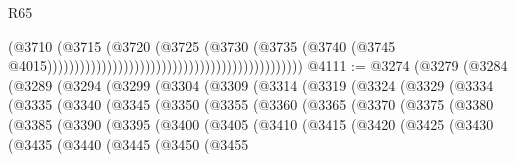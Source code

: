 \begin{lexlean}{R65}
\begin{coremodule}
{                                                                                  (@3710
                                                                                    (@3715
                                                                                      (@3720
                                                                                        (@3725
                                                                                          (@3730
                                                                                            (@3735
                                                                                              (@3740
                                                                                                (@3745
                                                                                                  @4015)))))))))))))))))))))))))))))))))))))))))))))))
@4111 := @3274
    (@3279
      (@3284
        (@3289
          (@3294
            (@3299
              (@3304
                (@3309
                  (@3314
                    (@3319
                      (@3324
                        (@3329
                          (@3334
                            (@3335
                              (@3340
                                (@3345
                                  (@3350
                                    (@3355
                                      (@3360
                                        (@3365
                                          (@3370
                                            (@3375
                                              (@3380
                                                (@3385
                                                  (@3390
                                                    (@3395
                                                      (@3400
                                                        (@3405
                                                          (@3410
                                                            (@3415
                                                              (@3420
                                                                (@3425
                                                                  (@3430
                                                                    (@3435
                                                                      (@3440
                                                                        (@3445
                                                                          (@3450
                                                                            (@3455
}
\end{coremodule}
\end{lexlean}
